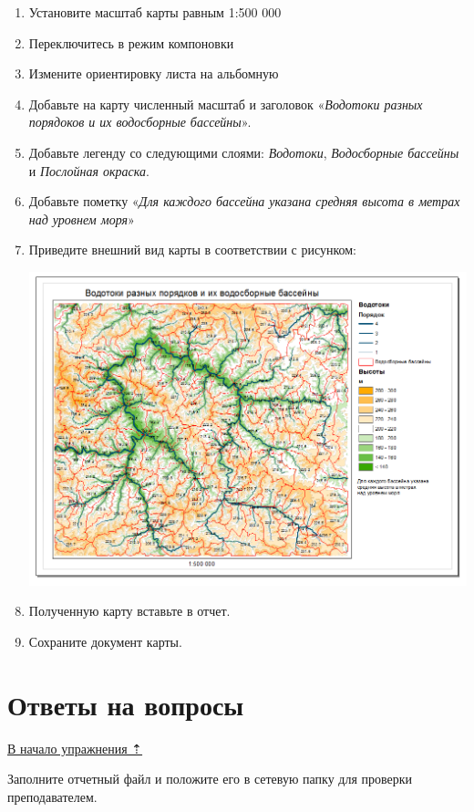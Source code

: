 \documentclass[]{book}
\theoremstyle{definition}
\theoremstyle{definition}
\theoremstyle{definition}
\theoremstyle{remark}
\begin{document}
\begin{enumerate}
\def\labelenumi{\arabic{enumi}.}
\item
  Установите масштаб карты равным 1:500 000
\item
  Переключитесь в режим компоновки
\item
  Измените ориентировку листа на альбомную
\item
  Добавьте на карту численный масштаб и заголовок «\emph{Водотоки разных
  порядоков и их водосборные бассейны}».
\item
  Добавьте легенду со следующими слоями: \emph{Водотоки},
  \emph{Водосборные бассейны} и \emph{Послойная окраска}.
\item
  Добавьте пометку «\emph{Для каждого бассейна указана средняя высота в
  метрах над уровнем моря}»
\item
  Приведите внешний вид карты в соответствии с рисунком:

  \includegraphics{images/Ex17/image32.png}
\item
  Полученную карту вставьте в отчет.
\item
  Сохраните документ карты.
\end{enumerate}

\hypertarget{dem-questions}{%
\section{Ответы на вопросы}\label{dem-questions}}

\protect\hyperlink{dem-analysis}{В начало упражнения ⇡}

Заполните отчетный файл и положите его в сетевую папку для проверки
преподавателем.
\end{document}
